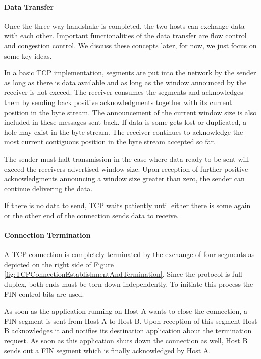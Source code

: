 \paragraph{Data Transfer}

Once the three-way handshake is completed, the two hosts can exchange data with each other. Important functionalities of the data transfer are flow control and congestion control. We discuss these concepts later, for now, we just focus on some key ideas. 

In a basic TCP implementation, segments are put into the network by the sender as long as there is data available and as long as the window announced by the receiver is not exceed. The receiver consumes the segments and acknowledges them by sending back positive acknowledgments together with its current position in the byte stream. The announcement of the current window size is also included in these messages sent back. If data is some gets lost or duplicated, a hole may exist in the byte stream. The receiver continues to acknowledge the most current contiguous position in the byte stream accepted so far.

The sender must halt transmission in the case where data ready to be sent will exceed the receivers advertised window size. Upon reception of further positive acknowledgments announcing a window size greater than zero, the sender can continue delivering the data.

If there is no data to send, TCP waits patiently until either there is some again or the other end of the connection sends data to receive.  

\paragraph{Connection Termination}

A TCP connection is completely terminated by the exchange of four segments as depicted on the right side of Figure \ref{fig:TCPConnectionEstablishmentAndTermination}. Since the protocol is full-duplex, both ends must be torn down independently. To initiate this process the FIN control bits are used. 

As soon as the application running on Host A wants to close the connection, a FIN segment is sent from Host A to Host B. Upon reception of this segment Host B acknowledges it and notifies its destination application about the termination request. As soon as this application shuts down the connection as well, Host B sends out a FIN segment which is finally acknowledged by Host A.

